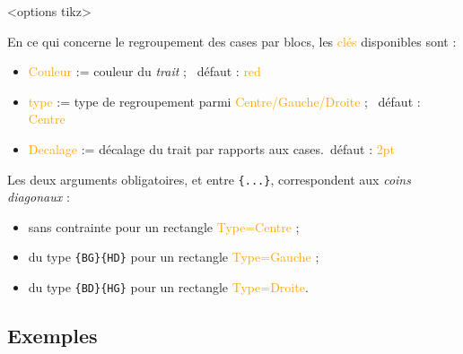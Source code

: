 \documentclass[french,a4paper,11pt]{article}
\newcommand\Cle[1]{{\small\sffamily\textlangle \textcolor{orange}{#1}\textrangle}}
\begin{document}
{{\begin{DemoCode}
\begin{TableKarnaugh}[clés]<options tikz>
\end{TableKarnaugh}
\end{DemoCode}

\begin{tipblock}
En ce qui concerne le regroupement des cases par blocs, les \Cle{clés} disponibles sont :

\begin{itemize}
	\item \Cle{Couleur} := couleur du \textit{trait} ; \hfill~défaut : \Cle{red}
	\item \Cle{type} := type de regroupement parmi \Cle{Centre/Gauche/Droite} ; \hfill~défaut : \Cle{Centre}
	\item \Cle{Decalage} := décalage du trait par rapports aux cases.\hfill~défaut : \Cle{2pt}
\end{itemize}

Les deux arguments obligatoires, et entre \texttt{\{...\}}, correspondent aux \textit{coins diagonaux} :

\begin{itemize}
	\item sans contrainte pour un rectangle \Cle{Type=Centre} ;
	\item du type \texttt{\{BG\}\{HD\}} pour un rectangle \Cle{Type=Gauche} ;
	\item du type \texttt{\{BD\}\{HG\}} pour un rectangle \Cle{Type=Droite}.
\end{itemize}
\vspace*{-\baselineskip}\leavevmode
\end{tipblock}

\subsection{Exemples}

}}
\end{document}
